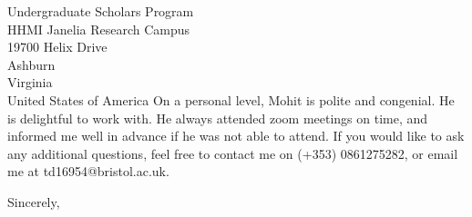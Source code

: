 \documentclass[11pt]{letter} %
\begin{document}
\begin{letter}{Undergraduate Scholars Program \\
  HHMI Janelia Research Campus \\
  19700 Helix Drive\\
  Ashburn \\
  Virginia \\
  United States of America}
  On a personal level, Mohit is polite and congenial. He is delightful to work with. He always attended zoom meetings on time, and informed me well in advance if he was not able to attend. If you would like to ask any additional questions, feel free to contact me on (+353) 0861275282, or email me at td16954@bristol.ac.uk.

  \vspace{2\parskip} %
  \closing{Sincerely,}
  \vspace{2\parskip} %




\end{letter}
\end{document}
